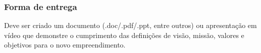 \subsubsection{Forma de entrega}

Deve ser criado um documento (.doc/.pdf/.ppt, entre outros) ou apresentação em
vídeo que demonstre o cumprimento das definições de visão, missão, valores e
objetivos para o novo empreendimento.

\newpage

